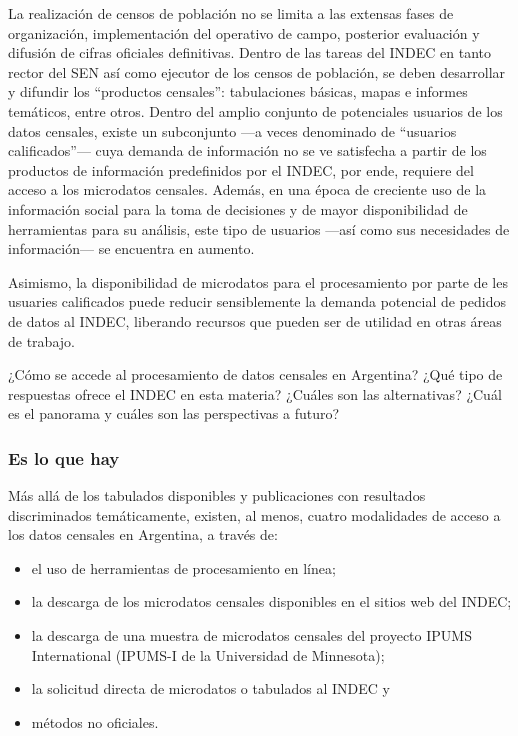 \documentclass[
]{article}
\providecommand{\tightlist}{%
  \setlength{\itemsep}{0pt}\setlength{\parskip}{0pt}}
\begin{document}
La realización de censos de población no se limita a las extensas fases de organización, implementación del operativo de campo, posterior evaluación y difusión de cifras oficiales definitivas. Dentro de las tareas del INDEC en tanto rector del SEN así como ejecutor de los censos de población, se deben desarrollar y difundir los ``productos censales'': tabulaciones básicas, mapas e informes temáticos, entre otros. Dentro del amplio conjunto de potenciales usuarios de los datos censales, existe un subconjunto ---a veces denominado de ``usuarios calificados''--- cuya demanda de información no se ve satisfecha a partir de los productos de información predefinidos por el INDEC, por ende, requiere del acceso a los microdatos censales. Además, en una época de creciente uso de la información social para la toma de decisiones y de mayor disponibilidad de herramientas para su análisis, este tipo de usuarios ---así como sus necesidades de información--- se encuentra en aumento.

Asimismo, la disponibilidad de microdatos para el procesamiento por parte de les usuaries calificados puede reducir sensiblemente la demanda potencial de pedidos de datos al INDEC, liberando recursos que pueden ser de utilidad en otras áreas de trabajo.

¿Cómo se accede al procesamiento de datos censales en Argentina? ¿Qué tipo de respuestas ofrece el INDEC en esta materia? ¿Cuáles son las alternativas? ¿Cuál es el panorama y cuáles son las perspectivas a futuro?

\hypertarget{es-lo-que-hay}{%
\subsubsection{Es lo que hay}\label{es-lo-que-hay}}

Más allá de los tabulados disponibles y publicaciones con resultados discriminados temáticamente, existen, al menos, cuatro modalidades de acceso a los datos censales en Argentina, a través de:

\begin{itemize}
\tightlist
\item
  el uso de herramientas de procesamiento en línea;
\item
  la descarga de los microdatos censales disponibles en el sitios web del INDEC;
\item
  la descarga de una muestra de microdatos censales del proyecto IPUMS International (IPUMS-I de la Universidad de Minnesota);
\item
  la solicitud directa de microdatos o tabulados al INDEC y
\item
  métodos no oficiales.
\end{itemize}
\end{document}
